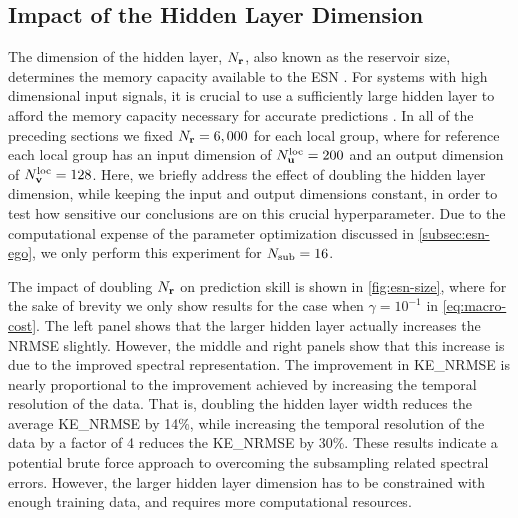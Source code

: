 \documentclass[draft]{agujournal2019}
\newcommand{\citep}{\cite}
\begin{document}
\subsection{Impact of the Hidden Layer Dimension}
\label{subsec:esn-size}

The dimension of the hidden layer, $N_{\mathbf{r}}$, also known as the reservoir size, determines the
memory capacity available to the ESN
\citep{jaeger_echo_2001,lukosevicius_practical_2012}.
For systems with high dimensional input signals, it is crucial to use a sufficiently large hidden layer to afford the memory capacity necessary for accurate
predictions \citep{hermans_memory_2010}.
In all of the preceding sections we fixed $N_{\mathbf{r}}=6,000$ for each local group,
where for reference each local group has an input dimension of
$N_{\mathbf{u}}^\text{loc}=200$ and an output dimension of $N_{\mathbf{v}}^\text{loc}=128$.
Here, we briefly address the effect of doubling the hidden layer dimension, while keeping the input and output dimensions constant, in order to test how
sensitive our conclusions are on this crucial hyperparameter.
Due to the computational expense of the parameter optimization discussed in
\cref{subsec:esn-ego}, we only perform this experiment for $N_\text{sub}=16$.

The impact of doubling $N_{\mathbf{r}}$ on prediction skill is shown in
\cref{fig:esn-size}, where for the sake of brevity we only show results for the
case when $\gamma=10^{-1}$ in \cref{eq:macro-cost}.
The left panel shows that the larger hidden layer actually increases the NRMSE slightly.
However, the middle and right panels show that this increase is due to the improved
spectral representation.
The improvement in KE\_NRMSE is nearly proportional to the improvement achieved by increasing
the temporal resolution of the data.
That is, doubling the hidden layer width reduces the average KE\_NRMSE by 14\%,
while increasing the temporal resolution of the data by a factor of 4 reduces
the KE\_NRMSE by 30\%.
These results indicate a potential brute force approach to overcoming the
subsampling related spectral errors.
However, the larger hidden layer dimension has to be constrained
with enough training data, and requires more
computational resources.
\end{document}
